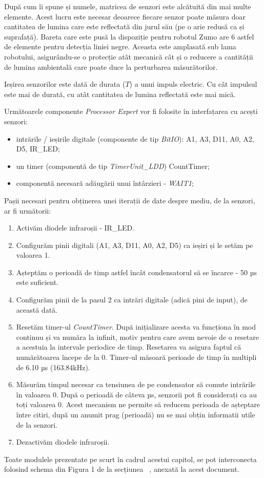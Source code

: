 După cum îi spune și numele, matricea de senzori este alcătuită din mai multe elemente. Acest lucru este necesar deoarece fiecare senzor poate măsura doar cantitatea de lumina care este reflectată din jurul său (pe o arie redusă ca și suprafață). Bareta care este pusă la dispoziție pentru robotul Zumo are 6 astfel de elemente pentru detecția liniei negre. Aceasta este amplasată sub lama robotului, asigurându-se o protecție atât mecanică cât și o reducere a cantității de lumina ambientală care poate duce la perturbarea măsurătorilor.

Ieșirea senzorilor este dată de durata ($T$) a unui impuls electric. Cu cât impulsul este mai de durată, cu atât cantitatea de lumina reflectată este mai mică.

Următoarele componente \textit{Processor Expert} vor fi folosite în interfațarea cu acești senzori:

\begin{itemize}
    \item intrările / ieșirile digitale (componente de tip \textit{BitIO}): A1, A3, D11, A0, A2, D5, IR\_LED;
    \item un timer (componentă de tip \textit{TimerUnit\_LDD}) CountTimer;
    \item componentă necesară adăugării unui întârzieri - \textit{WAIT1};
\end{itemize}

Pașii necesari pentru obținerea unei iterații de date despre mediu, de la senzori, ar fi următorii:

\begin{enumerate}
    \item Activăm diodele infraroșii - IR\_LED.
    \item Configurăm pinii digitali (A1, A3, D11, A0, A2, D5) ca ieșiri și le setăm pe valoarea 1.
    \item Așteptăm o perioadă de timp astfel încât condensatorul să se încarce - 50 µs este suficient.
    \item Configurăm pinii de la pasul 2 ca intrări digitale (adică pini de input), de această dată.
    \item Resetăm timer-ul \textit{CountTimer}. După inițializare acesta va funcționa în mod continuu și va număra la infinit, motiv pentru care avem nevoie de o resetare a acestuia la intervale periodice de timp. Resetarea va asigura faptul că numărătoarea începe de la 0. Timer-ul măsoară perioade de timp în multipli de 6.10 µs (163.84kHz).
    \item Măsurăm timpul necesar ca tensiunea de pe condensator să comute intrările în valoarea 0. După o perioadă de câteva µs, senzorii pot fi considerați ca au toți valoarea 0. Acest mecanism ne permite să reducem perioada de așteptare între citiri, după un anumit prag (perioadă) nu se mai obțin informatii utile de la senzori.
    \item Dezactivăm diodele infraroșii.
\end{enumerate}

Toate modulele prezentate pe scurt în cadrul acestui capitol, se pot interconecta folosind schema din Figura 1 de la secțiunea \textit{~}, anexată la acest document.